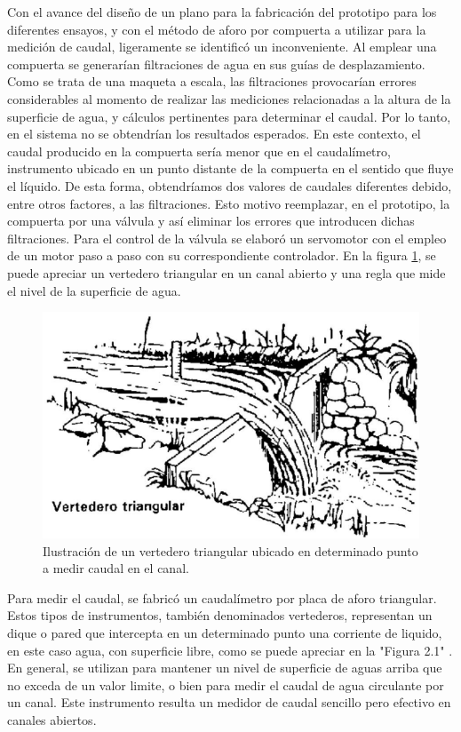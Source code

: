 Con el avance del diseño de un plano para la fabricación del prototipo para los diferentes ensayos, y con el método de aforo por compuerta a utilizar para la medición de caudal, ligeramente se identificó un inconveniente. Al emplear una compuerta se generarían filtraciones de agua en sus guías de desplazamiento. Como se trata de una maqueta a escala, las filtraciones provocarían errores considerables al momento de realizar las mediciones relacionadas a la altura de la superficie de agua, y cálculos pertinentes para determinar el caudal. Por lo tanto, en el sistema no se obtendrían los resultados esperados. En este contexto, el caudal producido en la compuerta sería menor que en el caudalímetro, instrumento ubicado en un punto distante de la compuerta en el sentido que fluye el líquido. De esta forma, obtendríamos dos valores de caudales diferentes debido, entre otros factores, a las filtraciones.     
Esto motivo reemplazar, en el prototipo, la compuerta por una válvula y así eliminar los errores que introducen dichas filtraciones. 
Para el control de la válvula se elaboró un servomotor con el empleo de un motor paso a paso con su correspondiente controlador.
En la figura \ref{fig:Vertedero triangular}, se puede apreciar un vertedero triangular en un canal abierto y una regla que mide el nivel de la superficie de agua.
\begin{figure}[h]
\centering
\includegraphics[scale=.60]{./Figures/VertederoTriangular.png}
\caption{Ilustración de un vertedero triangular ubicado en determinado punto a medir caudal en el canal.}
\label{fig:Vertedero triangular}
\end{figure}

Para medir el caudal, se fabricó un caudalímetro por placa de aforo triangular. Estos tipos de instrumentos, también denominados vertederos, representan un dique o pared que intercepta en un determinado punto una corriente de liquido, en este caso agua, con superficie libre, como se puede apreciar en la "Figura 2.1" . En general, se utilizan para mantener un nivel de superficie de aguas arriba que no exceda de un valor limite, o bien para medir el caudal de agua circulante por un canal. Este instrumento resulta un medidor de caudal sencillo pero efectivo en canales abiertos. 

